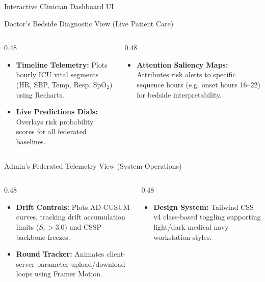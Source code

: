 \documentclass[aspectratio=169, 11pt]{beamer}
\begin{document}
\begin{frame}{Interactive Clinician Dashboard UI}
    \begin{block}{Doctor's Bedside Diagnostic View (Live Patient Care)}
        \begin{columns}[t]
            \begin{column}{0.48\textwidth}
                \scriptsize
                \begin{itemize}
                    \item \textbf{Timeline Telemetry:} Plots hourly ICU vital segments (HR, SBP, Temp, Resp, SpO$_2$) using Recharts.
                    \item \textbf{Live Predictions Dials:} Overlays risk probability scores for all federated baselines.
                \end{itemize}
            \end{column}
            \begin{column}{0.48\textwidth}
                \scriptsize
                \begin{itemize}
                    \item \textbf{Attention Saliency Maps:} Attributes risk alerts to specific sequence hours (e.g. onset hours 16--22) for bedside interpretability.
                \end{itemize}
            \end{column}
        \end{columns}
    \end{block}
    
    \begin{block}{Admin's Federated Telemetry View (System Operations)}
        \begin{columns}[t]
            \begin{column}{0.48\textwidth}
                \scriptsize
                \begin{itemize}
                    \item \textbf{Drift Controls:} Plots AD-CUSUM curves, tracking drift accumulation limits ($S_r > 3.0$) and CSSP backbone freezes.
                    \item \textbf{Round Tracker:} Animates client-server parameter upload/download loops using Framer Motion.
                \end{itemize}
            \end{column}
            \begin{column}{0.48\textwidth}
                \scriptsize
                \begin{itemize}
                    \item \textbf{Design System:} Tailwind CSS v4 class-based toggling supporting light/dark medical navy workstation styles.
                \end{itemize}
            \end{column}
        \end{columns}
    \end{block}
\end{frame}
\end{document}
